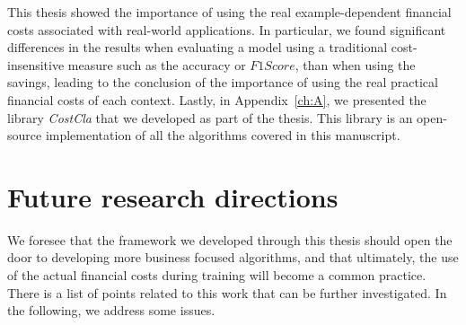 This thesis showed the importance of using the real example-dependent financial costs 
associated with real-world applications. In particular, we found significant differences in the 
results when evaluating a model using a  traditional cost-insensitive measure such as the 
accuracy or $F1Score$,  than when using the savings, leading to the conclusion of the 
importance of using the real practical financial costs of each context. Lastly, in 
Appendix~\ref{ch:A}, we presented the library \mbox{\textit{CostCla}} that we developed 
as part of the thesis. This library is an open-source implementation of all the algorithms covered 
in this manuscript. 


\section{Future research directions}

We foresee that the framework we developed through this thesis should open the door to 
developing more business focused algorithms, and that ultimately, the use of the actual financial 
costs during training will become a common practice. There is a list of points related to this work 
that can be further investigated. In the following, we address some issues. 

